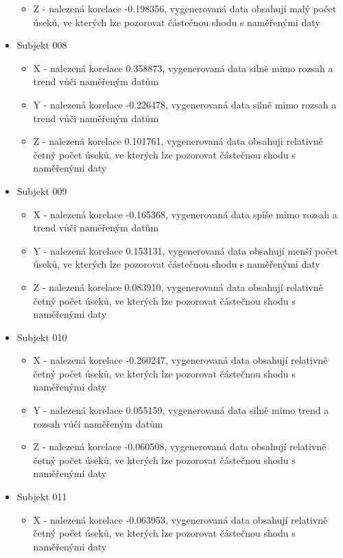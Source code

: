\documentclass[12pt, a4paper]{article}
\begin{document}
\begin{itemize}
\begin{itemize}
        \item Z - nalezená korelace -0.198356,  vygenerovaná data obsahují malý počet úseků, ve kterých lze pozorovat částečnou shodu s naměřenými daty 
      \end{itemize}
  \item Subjekt 008 
      \begin{itemize}
        \item X - nalezená korelace 0.358873, vygenerovaná data silně mimo rozsah a trend vůči naměřeným datům 
        \item Y - nalezená korelace -0.226478, vygenerovaná data silně mimo rozsah a trend vůči naměřeným datům 
        \item Z - nalezená korelace 0.101761, vygenerovaná data obsahuji relativně četný počet úseků, ve kterých lze pozorovat částečnou shodu s naměřenými daty 
      \end{itemize}
  \item Subjekt 009 
      \begin{itemize}
        \item X - nalezená korelace -0.165368, vygenerovaná data spíše mimo rozsah a trend vůči naměřeným datům 
        \item Y - nalezená korelace 0.153131, vygenerovaná data obsahují menší počet úseků, ve kterých lze pozorovat částečnou shodu s naměřenými daty 
        \item Z - nalezená korelace 0.083910, vygenerovaná data obsahují relativně četný počet úseků, ve kterých lze pozorovat částečnou shodu s naměřenými daty   
      \end{itemize}
  \item Subjekt 010
      \begin{itemize}
        \item X - nalezená korelace -0.260247, vygenerovaná data obsahují relativně četný počet úseků, ve kterých lze pozorovat částečnou shodu s naměřenými daty 
        \item Y - nalezená korelace 0.055159, vygenerovaná data silně mimo trend a rozsah vůči naměřeným datům  
        \item Z - nalezená korelace -0.060508, vygenerovaná data obsahují relativně četný počet úseků, ve kterých lze pozorovat částečnou shodu s naměřenými daty 
      \end{itemize}
  \item Subjekt 011
      \begin{itemize}
        \item X - nalezená korelace -0.063953, vygenerovaná data obsahují relativně četný počet úseků, ve kterých lze pozorovat částečnou shodu s naměřenými daty 

\end{itemize}
\end{itemize}
\end{document}
